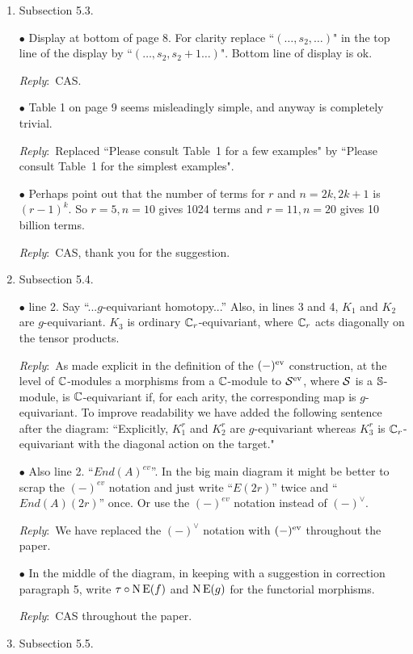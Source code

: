 \documentclass{amsart}
\newcommand{\ar}{\medskip\noindent\textit{Reply}:\ }
\def\subitem{\medskip\noindent$\bullet$ }
\begin{document}
\begin{enumerate}
	\ar CAS, thank you.

	\item Subsection 5.3.

	\subitem Display at bottom of page 8.
	For clarity replace ``$(\dots,s_2,\dots)$" in the top line of the display by ``$(\dots,s_2,s_2+1\dots)$".
	Bottom line of display is ok.

	\ar CAS.

	\subitem Table 1 on page 9 seems misleadingly simple, and anyway is completely trivial.

	\ar Replaced ``Please consult Table~1 for a few examples" by ``Please consult Table~1 for the simplest examples".

	\subitem Perhaps point out that the number of terms for $r$ and $n = 2k, 2k + 1$ is $(r - 1)^k$.
	So $r = 5, n = 10$ gives 1024 terms and $r = 11, n = 20$ gives 10 billion terms.

	\ar CAS, thank you for the suggestion.

	\item Subsection 5.4.

	\subitem line 2. Say ``...$g$-equivariant homotopy...” Also, in lines 3 and 4, $K_1$ and $K_2$ are $g$-equivariant.
	$K_3$ is ordinary $\mathbb{C}_r$-equivariant, where $\mathbb{C}_r$ acts diagonally on the tensor products.

	\ar As made explicit in the definition of the $(-)^{\mathrm{ev}}$ construction, at the level of $\mathbb{C}$-modules a morphisms from a $\mathbb{C}$-module to $\mathcal{S}^{\mathrm{ev}}$, where $\mathcal{S}$ is a $\mathbb{S}$-module, is $\mathbb{C}$-equivariant if, for each arity, the corresponding map is $g$-equivariant.
	To improve readability we have added the following sentence after the diagram:
	``Explicitly, $K_1^r$ and $K_2^r$ are $g$-equivariant whereas $K_3^r$ is $\mathbb{C}_r$-equivariant with the diagonal action on the target."

	\subitem Also line 2. ``$End(A)^{ev}$”.
	In the big main diagram it might be better to scrap the $(-)^{ev}$ notation and just write ``$E(2r)$” twice and ``$End(A)(2r)$” once.
	Or use the $(-)^{ev}$ notation instead of $(-)^\vee$.

	\ar We have replaced the $(-)^\vee$ notation with $(-)^{\mathrm{ev}}$ throughout the paper.

	\subitem In the middle of the diagram, in keeping with a suggestion in correction paragraph 5, write
	$\tau \mathbin{\circ} \operatorname{N}\operatorname{E}(f)$ and $\operatorname{N}\operatorname{E}(g)$ for the functorial morphisms.

	\ar CAS throughout the paper.

	\item Subsection 5.5.


\end{enumerate}
\end{document}
